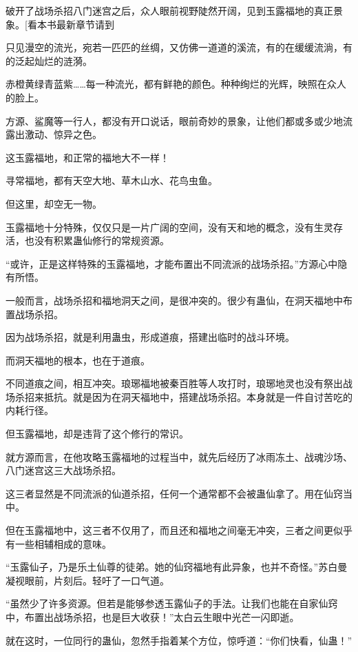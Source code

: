 
\begin{this_body}

破开了战场杀招八门迷宫之后，众人眼前视野陡然开阔，见到玉露福地的真正景象。[看本书最新章节请到

只见漫空的流光，宛若一匹匹的丝绸，又仿佛一道道的溪流，有的在缓缓流淌，有的泛起灿烂的涟漪。

赤橙黄绿青蓝紫……每一种流光，都有鲜艳的颜色。种种绚烂的光辉，映照在众人的脸上。

方源、鲨魔等一行人，都没有开口说话，眼前奇妙的景象，让他们都或多或少地流露出激动、惊异之色。

这玉露福地，和正常的福地大不一样！

寻常福地，都有天空大地、草木山水、花鸟虫鱼。

但这里，却空无一物。

玉露福地十分特殊，仅仅只是一片广阔的空间，没有天和地的概念，没有生灵存活，也没有积累蛊仙修行的常规资源。

“或许，正是这样特殊的玉露福地，才能布置出不同流派的战场杀招。”方源心中隐有所悟。

一般而言，战场杀招和福地洞天之间，是很冲突的。很少有蛊仙，在洞天福地中布置战场杀招。

因为战场杀招，就是利用蛊虫，形成道痕，搭建出临时的战斗环境。

而洞天福地的根本，也在于道痕。

不同道痕之间，相互冲突。琅琊福地被秦百胜等人攻打时，琅琊地灵也没有祭出战场杀招来抵抗。就是因为在洞天福地中，搭建战场杀招。本身就是一件自讨苦吃的内耗行径。

但玉露福地，却是违背了这个修行的常识。

就方源而言，在他攻略玉露福地的过程当中，就先后经历了冰雨冻土、战魂沙场、八门迷宫这三大战场杀招。

这三者显然是不同流派的仙道杀招，任何一个通常都不会被蛊仙拿了。用在仙窍当中。

但在玉露福地中，这三者不仅用了，而且还和福地之间毫无冲突，三者之间更似乎有一些相辅相成的意味。

“玉露仙子，乃是乐土仙尊的徒弟。她的仙窍福地有此异象，也并不奇怪。”苏白曼凝视眼前，片刻后。轻吁了一口气道。

“虽然少了许多资源。但若是能够参透玉露仙子的手法。让我们也能在自家仙窍中，布置出战场杀招，也是巨大收获！”太白云生眼中光芒一闪即逝。

就在这时，一位同行的蛊仙，忽然手指着某个方位，惊呼道：“你们快看，仙蛊！”


\end{this_body}
